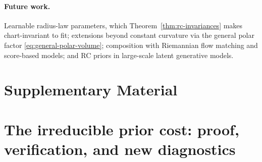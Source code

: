 \documentclass{article}
\theoremstyle{definition}
\theoremstyle{remark}
\begin{document}
\paragraph{Future work.} Learnable radius-law parameters, which Theorem~\ref{thm:rc-invariances} makes chart-invariant to fit; extensions beyond constant curvature via the general polar factor \eqref{eq:general-polar-volume}; composition with Riemannian flow matching and score-based models; and RC priors in large-scale latent generative models.








\clearpage
\setcounter{page}{1}

\appendix
\onecolumn

\section*{Supplementary Material}





% 




\section{The irreducible prior cost: proof, verification, and new diagnostics}
\label{app:floor}
\end{document}

